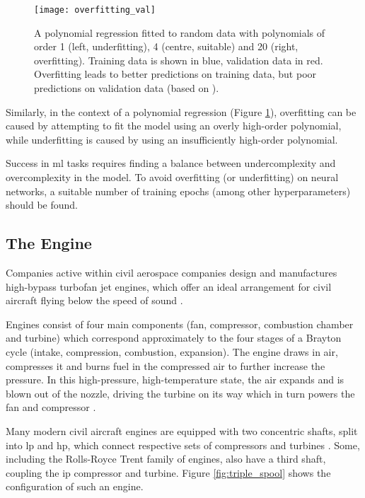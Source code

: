 \begin{figure}
    \centering
    \texttt{[image: overfitting\_val]}
    \caption{\label{fig:overfitting} A polynomial regression fitted to random data with polynomials of order 1 (left, underfitting), 4 (centre, suitable) and 20 (right, overfitting). Training data is shown in blue, validation data in red. Overfitting leads to better predictions on training data, but poor predictions on validation data (based on \protect\citet{vanderplas_python_2016}).}
\end{figure}

Similarly, in the context of a polynomial regression (Figure \ref{fig:overfitting}), overfitting can be caused by attempting to fit the model using an overly high-order polynomial, while underfitting is caused by using an insufficiently high-order polynomial. \cite[p. 365]{vanderplas_python_2016}

Success in \ac{ml} tasks requires finding a balance between undercomplexity and overcomplexity in the model. To avoid overfitting (or underfitting) on neural networks, a suitable number of training epochs (among other hyperparameters) should be found.

\subsection{The Engine}
Companies active within civil aerospace companies design and manufactures high-bypass turbofan jet engines, which offer an ideal arrangement for civil aircraft flying below the speed of sound \cite[]{rolls-royce_plc_jet_2015}.

Engines consist of four main components (fan, compressor, combustion chamber and turbine) which correspond approximately to the four stages of a Brayton cycle (intake, compression, combustion, expansion). The engine draws in air, compresses it and burns fuel in the compressed air to further increase the pressure. In this high-pressure, high-temperature state, the air expands and is blown out of the nozzle, driving the turbine on its way which in turn powers the fan and compressor \cite[]{rolls-royce_plc_jet_2015}.

Many modern civil aircraft engines are equipped with two concentric shafts, split into \ac{lp} and \ac{hp}, which connect respective sets of compressors and turbines \cite[]{spittle_gas_2003}. Some, including the Rolls-Royce Trent family of engines, also have a third shaft, coupling the \ac{ip} compressor and turbine. Figure \ref{fig:triple_spool} shows the configuration of such an engine.

